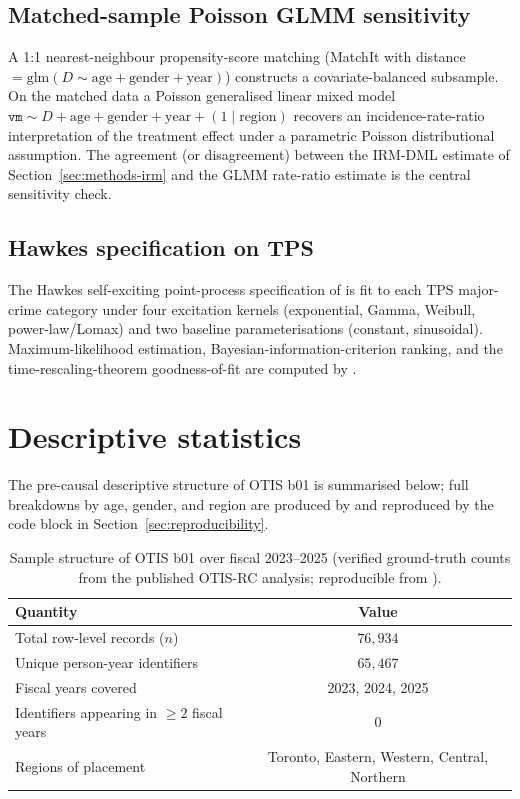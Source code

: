 \documentclass[article,shortnames,nojss]{jss}
\newcommand{\OTIS}{\textsf{OTIS}}
\newcommand{\TPS}{\textsf{TPS}}
\newcommand{\vm}{\texttt{vm}}
\begin{document}
\subsection{Matched-sample Poisson GLMM sensitivity}
\label{sec:methods-matchit}

A 1:1 nearest-neighbour propensity-score matching (MatchIt with
distance $= \mathrm{glm}(D \sim \mathrm{age} + \mathrm{gender} +
\mathrm{year})$) constructs a covariate-balanced subsample. On the
matched data a Poisson generalised linear mixed model
$\vm \sim D + \mathrm{age} + \mathrm{gender} + \mathrm{year} +
(1 \mid \mathrm{region})$ recovers an incidence-rate-ratio
interpretation of the treatment effect under a parametric Poisson
distributional assumption. The agreement (or disagreement) between
the IRM-DML estimate of Section~\ref{sec:methods-irm} and the GLMM
rate-ratio estimate is the central sensitivity check.


\subsection[Hawkes specification on TPS]{Hawkes specification on \TPS{}}
\label{sec:methods-hawkes}

The Hawkes self-exciting point-process specification of
\citet{Ruhela2026Hawkes} is fit to each \TPS{} major-crime category
under four excitation kernels (exponential, Gamma, Weibull,
power-law/Lomax) and two baseline parameterisations (constant,
sinusoidal). Maximum-likelihood estimation, Bayesian-information-criterion
ranking, and the time-rescaling-theorem goodness-of-fit
\citep{BrownEtAl2002} are computed by
.

\section{Descriptive statistics}
\label{sec:descriptives}

The pre-causal descriptive structure of \OTIS{} b01 is summarised
below; full breakdowns by age, gender, and region are produced by
 and reproduced by the code block
in Section~\ref{sec:reproducibility}.

\begin{table}[h]
\centering
\caption{Sample structure of \OTIS{} b01 over fiscal 2023--2025
(verified ground-truth counts from the published OTIS-RC analysis;
reproducible from ).}
\label{tab:otis-counts}
\begin{tabular}{lc}
\toprule
Quantity & Value \\
\midrule
Total row-level records ($n$) & $76{,}934$ \\
Unique person-year identifiers & $65{,}467$ \\
Fiscal years covered & 2023, 2024, 2025 \\
Identifiers appearing in $\ge 2$ fiscal years & $0$ \\
Regions of placement & Toronto, Eastern, Western, Central, Northern \\
\bottomrule
\end{tabular}
\end{table}
\end{document}
